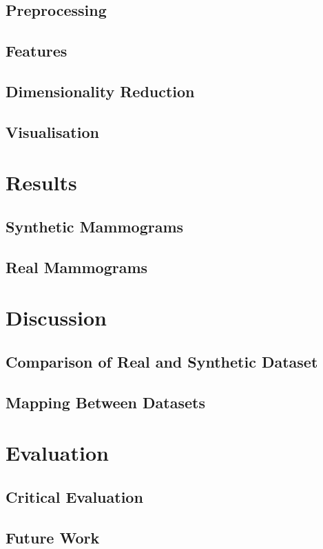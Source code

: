 \documentclass[paper=a4, fontsize=11pt]{scrartcl}	%
\numberwithin{equation}{section}															%
\numberwithin{figure}{section}																%
\numberwithin{table}{section}
\begin{document}
\subsection{Preprocessing}

\subsection{Features}

\subsection{Dimensionality Reduction}

\subsection{Visualisation}

\section{Results}

\subsection{Synthetic Mammograms}
\subsection{Real Mammograms}

\section{Discussion}

\subsection{Comparison of Real and Synthetic Dataset}
\subsection{Mapping Between Datasets}

\section{Evaluation}

\subsection{Critical Evaluation}

\subsection{Future Work}

\clearpage


\end{document}
